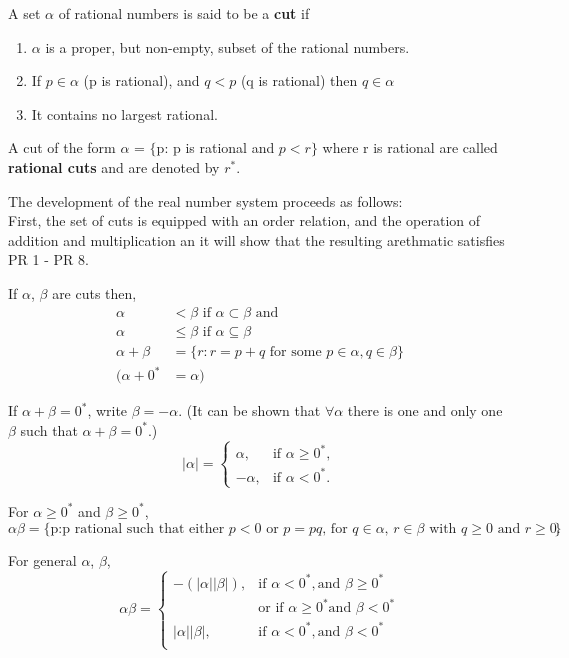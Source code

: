 \documentclass[11pt,fleqn]{book} %
\begin{document}
\begin{definition}
	A set $\alpha$ of rational numbers is said to be a \textbf{cut} if
	\begin{enumerate}[label = \alph*)]
		\item $\alpha$ is a proper, but non-empty, subset of the rational numbers.
		\item If $p \in \alpha$ (p is rational), and $q<p$ (q is rational) then $q \in \alpha$
		\item It contains no largest rational.
	\end{enumerate}
	A cut of the form $\alpha$ = $\{$p: p is rational and $p<r\}$ where r is rational are called \textbf{rational cuts} and are denoted by $r^*$.
\end{definition}

The development of the real number system proceeds as follows:\\
First, the set of cuts is equipped with an order relation, and the operation of addition and multiplication an it will show that the resulting arethmatic satisfies PR 1 - PR 8.  

If $\alpha$, $\beta$ are cuts then, 
\begin{align*}
	\alpha &< \beta \text{ if $\alpha \subset \beta$ and} \\
	\alpha &\le \beta \text{ if $\alpha \subseteq \beta$}\\
	\alpha + \beta &= \{r: r= p + q \text{ for some } p \in \alpha, q \in \beta\}\\
	(\alpha + 0^* &= \alpha)
\end{align*}

If $\alpha + \beta = 0^*$, write $\beta = -\alpha$. (It can be shown that $\forall \alpha$ there is one and only one $\beta$ such that $\alpha + \beta = 0^*$.) 
$$|\alpha| = \begin{cases}
  \alpha, & \text{if } \alpha \ge 0^*, \\
  -\alpha, & \text{if } \alpha < 0^* .
\end{cases} $$

For $\alpha \ge 0^*$ and $\beta \ge 0^*$, 
$$\alpha\beta = \{\text{p:p rational such that either $p<0$ or $p=pq$, for $q \in \alpha$, $r \in \beta$ with $q \ge 0$ and $r \ge 0$.}\}$$ 

For general $\alpha$, $\beta$,
$$\alpha\beta = \begin{cases}
  -(|\alpha||\beta|), & \text{if } \alpha < 0^*, \text{and } \beta \ge 0^*\\
  	& \text{or if } \alpha \ge 0^* \text{and } \beta < 0^*\\
  |\alpha||\beta|, & \text{if } \alpha < 0^*, \text{and } \beta < 0^*\\
\end{cases} $$
\end{document}
